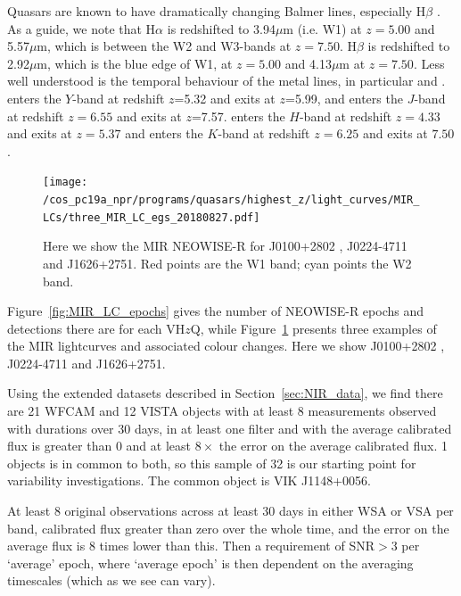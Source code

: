 \documentclass[usenatbib]{mnras}
\begin{document}
Quasars are known to have dramatically changing Balmer lines, especially H$\beta$ \citep[e.g.,][]{LaMassa2015, Ruan2016, Runnoe2016, Macleod2016, Gezari2017, Runco2016, YangQ2018, Assef2018, Stern2018, Ross2018, MacLeod2019, Graham2019}. As a guide, we note that H$\alpha$ is redshifted to 3.94$\mu$m (i.e. W1) at $z=5.00$ and 5.57$\mu$m, which is between the W2 and W3-bands at $z=7.50$. 
H$\beta$ is redshifted to 2.92$\mu$m, which is the blue edge of W1, at $z=5.00$ and 
4.13$\mu$m at $z=7.50$. 
Less well understood is the temporal behaviour of the metal lines, in particular \civ and \mgii. 
\civ enters the
$Y$-band at redshift $z$=5.32 and exits at $z$=5.99, and enters the
$J$-band at redshift $z=6.55$ and exits at $z$=7.57. \mgii enters the
$H$-band at redshift $z=4.33$ and exits at $z=5.37$ and enters the
$K$-band at redshift $z=6.25$ and exits at $7.50$.


\begin{figure}
  \texttt{[image: /cos\_pc19a\_npr/programs/quasars/highest\_z/light\_curves/MIR\_LCs/three\_MIR\_LC\_egs\_20180827.pdf]}
  \centering
  \caption[]
  {Here we show the MIR NEOWISE-R for J0100+2802 \citep{Wu2015}, J0224-4711 and  J1626+2751. 
    Red points are the W1 band; cyan points the W2 band.} 
  \label{fig:MIR_LC_3egs}
\end{figure}

Figure~\ref{fig:MIR_LC_epochs} gives the number of NEOWISE-R epochs and detections there are for each VH$z$Q, while Figure~\ref{fig:MIR_LC_3egs} presents three examples of the MIR lightcurves and associated colour changes. Here we show J0100+2802 \citep{Wu2015}, J0224-4711 and  J1626+2751. 

Using the extended datasets described in Section~\ref{sec:NIR_data}, we find there are 21 WFCAM and 12 VISTA objects with at least 8 measurements observed with durations over 30 days, in at least one filter and with the average calibrated flux is greater than 0 and at least $8\times$ the error on the average calibrated flux. 1 objects is in common to both, so this sample of 32 is our starting point for variability investigations. The common object is VIK J1148+0056. 

At least 8 original observations across at least 30 days in either WSA or VSA per band, calibrated flux greater than zero over the whole time, and the error on the average flux is 8 times lower than this. Then a requirement of SNR$>3$ per `average' epoch, where `average epoch' is then dependent on the averaging timescales (which as we see can vary). 
\end{document}
